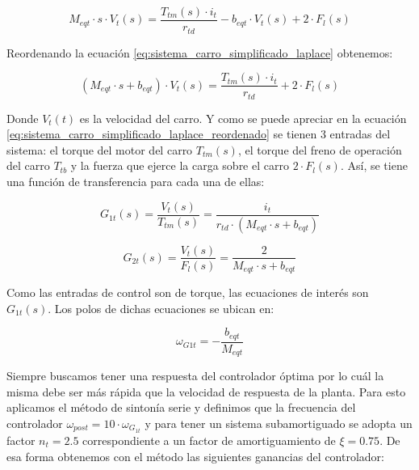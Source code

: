 \documentclass[11pt]{article}
\begin{document}
\begin{equation}
	\label{eq:sistema_carro_simplificado_laplace}
	M_{eqt}\cdot s\cdot V_{t}(s) = \frac{T_{tm}(s)\cdot i_{t}}{r_{td}}-b_{eqt}\cdot V_{t}(s) + 2\cdot F_{l}(s)
\end{equation}

Reordenando la ecuación \ref{eq:sistema_carro_simplificado_laplace} obtenemos:

\begin{equation}
	\label{eq:sistema_carro_simplificado_laplace_reordenado}
	\left ( M_{eqt}\cdot s+b_{eqt} \right )\cdot V_{t}(s) = \frac{T_{tm}(s)\cdot i_{t}}{r_{td}}+ 2\cdot F_{l}(s)
\end{equation}

Donde $V_{t}(t)$ es la velocidad del carro. Y como se puede apreciar en la ecuación \ref{eq:sistema_carro_simplificado_laplace_reordenado} se tienen 3 entradas del sistema: el torque del motor del carro $T_{tm}(s)$, el torque del freno de operación del carro $T_{tb}$ y la fuerza que ejerce la carga sobre el carro $2\cdot F_{l}(s)$. Así, se tiene una función de transferencia para cada una de ellas:

\begin{equation}
	\label{eq:sistema_carro_simplificado_laplace_G1t}
	G_{1t}(s)=\frac{V_{t}(s)}{T_{tm}(s)}=\frac{i_{t}}{r_{td}\cdot (M_{eqt}\cdot s+b_{eqt})}
\end{equation}

\begin{equation}
	\label{eq:sistema_carro_simplificado_laplace_G2t}
	G_{2t}(s)=\frac{V_{t}(s)}{F_{l}(s)}=\frac{2}{M_{eqt}\cdot s+b_{eqt}}
\end{equation}

Como las entradas de control son de torque, las ecuaciones de interés son $G_{1t}(s)$. Los polos de dichas ecuaciones se ubican en:

\begin{equation}
	\label{eq:sistema_carro_simplificado_laplace_polos}
	\omega_{G1t}=-\frac{b_{eqt}}{M_{eqt}}
\end{equation}

Siempre buscamos tener una respuesta del controlador óptima por lo cuál la misma debe ser más rápida que la velocidad de respuesta de la planta. Para esto aplicamos el método de sintonía serie y definimos que la frecuencia del controlador $\omega_{post}=10\cdot \omega_{G_{1t}}$ y para tener un sistema  subamortiguado se adopta un factor $n_{t}=2.5$ correspondiente a un factor de amortiguamiento de $\xi =0.75$. De esa forma obtenemos con el método las siguientes ganancias del controlador:
\end{document}
